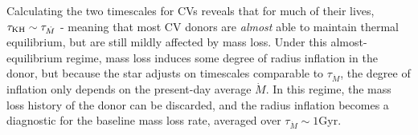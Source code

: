 Calculating the two timescales for CVs reveals that for much of their lives, $\tau_{\rm KH} \sim \tau_{\dot M}$ \citep{knigge11} - meaning that most CV donors are \textit{almost} able to maintain thermal equilibrium, but are still mildly affected by mass loss.
Under this almost-equilibrium regime, mass loss induces some degree of radius inflation in the donor, but because the star adjusts on timescales comparable to $\tau_{\dot M}$, the degree of inflation only depends on the present-day average $\dot M$. In this regime, the mass loss history of the donor can be discarded, and the radius inflation becomes a diagnostic for the baseline mass loss rate, averaged over $\tau_{\dot M} \sim 1$Gyr.


